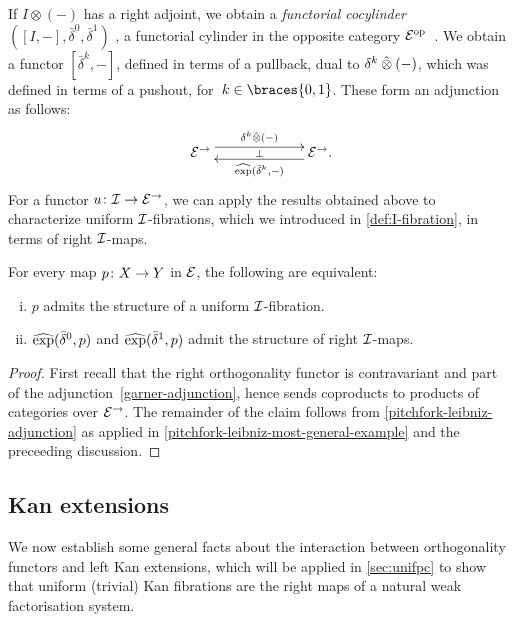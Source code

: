 \documentclass[reqno,10pt,a4paper,oneside,draft]{amsart}
\begin{document}
\medskip

If $I \otimes (-)$ has a right adjoint, we obtain a \emph{functorial cocylinder} $([I, -], \bar{\delta}^0, \bar{\delta}^1)$ , \ie a functorial cylinder in the opposite category $\catE^{\op}$~\cite{kamps-porter:homotopy}.
We obtain a functor $[\bar{\delta}^k, -]$, defined in terms of a pullback, dual to $\kcyl \hatotimes (-)$, which was defined in terms of a pushout, for~$k \in \braces{0, 1}$.
These form an adjunction as follows:
\[
\xymatrix@C+4em{
  \catE^\to \ar@<1ex>[r]^{\kcyl \hatotimes (-)} \ar@{}[r]|{\bot} &
  \catE^\to \rlap{.} \ar@<1ex>[l]^{\hatexp(\bar{\delta}^k, -)}
}
\]
For a functor $u \co \cal{I} \to \catE^\to$, we can apply the results obtained above to characterize uniform $\cal{I}$-fibrations, which we introduced in \cref{def:I-fibration}, in terms of right $\cal{I}$-maps.

\begin{proposition} \label{prod-exp-general}
For every map $p \co X \to Y$ in $\catE$, the following are equivalent:
\begin{enumerate}[(i)]
\item $p$ admits the structure of a uniform $\cal{I}$-fibration.
\item $\hatexp(\bar{\delta}^0, p)$ and $\hatexp(\bar{\delta}^1, p)$ admit the structure of right $\cal{I}$-maps.
\end{enumerate}
\end{proposition}

\begin{proof}
First recall that the right orthogonality functor is contravariant and part of the adjunction~\eqref{garner-adjunction}, hence sends coproducts to products of categories over $\catE^\to$.
The remainder of the claim follows from \cref{pitchfork-leibniz-adjunction} as applied in \cref{pitchfork-leibniz-most-general-example} and the preceeding discussion.
\end{proof}

\subsection*{Kan extensions}

We now establish some general facts about the interaction between orthogonality functors and left Kan extensions, which will be applied in \cref{sec:unifpc} to show that uniform (trivial) Kan fibrations are the right maps of a natural weak factorisation system.
\end{document}
